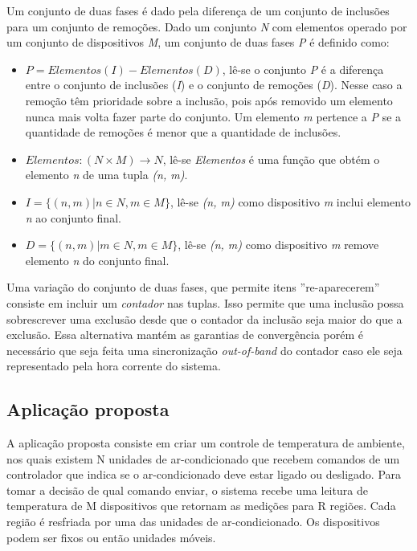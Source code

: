 \documentclass[12pt]{article}
\begin{document}
Um conjunto de duas fases é dado pela diferença de um conjunto de inclusões para um conjunto de remoções. Dado um conjunto {\it N} com elementos operado por um conjunto de dispositivos {\it M}, um conjunto de duas fases {\it P} é definido como:


\begin{itemize}
    \item \ensuremath{P = Elementos(I) - Elementos(D)}, lê-se o conjunto {\it P} é a diferença entre o conjunto de inclusões ({\it I}) e o conjunto de remoções ({\it D}). Nesse caso a remoção têm prioridade sobre a inclusão, pois após removido um elemento nunca mais volta fazer parte do conjunto. Um elemento {\it m} pertence a {\it P} se a quantidade de remoções é menor que a quantidade de inclusões.
    \item \ensuremath{Elementos : (N \times M) \to N}, lê-se {\it Elementos} é uma função que obtém o elemento {\it n} de uma tupla {\it (n, m)}.
    \item \ensuremath{I = \{(n, m) | n \in N, m \in M\}}, lê-se {\it (n, m)} como dispositivo {\it m} inclui elemento {\it n} ao conjunto final.
    \item \ensuremath{D = \{(n, m) | m \in N, m \in M\}}, lê-se {\it (n, m)} como dispositivo {\it m} remove elemento {\it n} do conjunto final.
\end{itemize}

Uma variação do conjunto de duas fases, que permite itens ''re-aparecerem'' consiste em incluir um {\it contador} nas tuplas. Isso permite que uma inclusão possa sobrescrever uma exclusão desde que o contador da inclusão seja maior do que a exclusão. Essa alternativa mantém as garantias de convergência porém é necessário que seja feita uma sincronização {\it out-of-band} do contador caso ele seja representado pela hora corrente do sistema. 

\subsection{Aplicação proposta}

A aplicação proposta consiste em criar um controle de temperatura de ambiente, nos quais existem N unidades de ar-condicionado que recebem comandos de um controlador que indica se o ar-condicionado deve estar ligado ou desligado. Para tomar a decisão de qual comando enviar, o sistema recebe uma leitura de temperatura de M dispositivos que retornam as medições para R regiões. Cada região é resfriada por uma das unidades de ar-condicionado. Os dispositivos podem ser fixos ou então unidades móveis.
\end{document}
